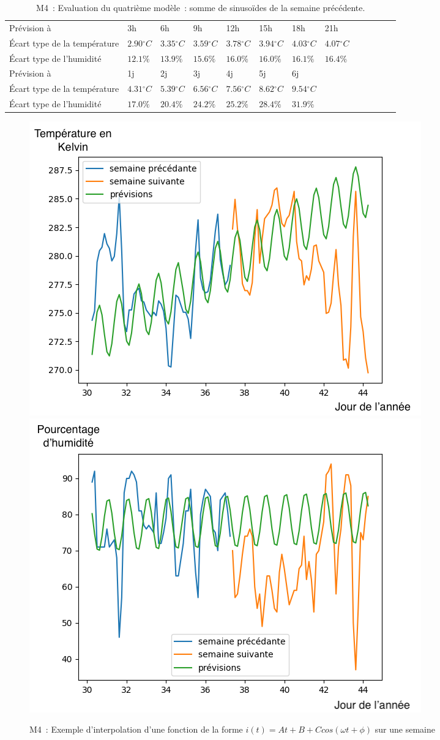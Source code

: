 \documentclass[11pt,a4paper]{article}
\begin{document}
\begin{table}[h]
\begin{center}
\begin{tabular}{lllllllllllll}\hline
\hline
Prévision à                  &3h                         &6h                        &9h                           &12h                         &15h                          &18h          &         21h      \\
Écart type de la température& $2.90{}^{\circ}C$& $3.35{}^{\circ}C$& $3.59{}^{\circ}C$& $3.78{}^{\circ}C$& $3.94{}^{\circ}C$& $4.03{}^{\circ}C$&$4.07{}^{\circ}C$\\
Écart type de l'humidité &$12.1\%$ & $13.9\%$ & $15.6\%$ & $16.0\%$ & $16.0\%$ & $16.1\%$ & $16.4\%$  \\
\hline
Prévision à                  & 1j &           2j            &3j            &4j          &5j            & 6j & \\
Écart type de la température&$4.31{}^{\circ}C$&$5.39{}^{\circ}C$&$6.56{}^{\circ}C$&$7.56{}^{\circ}C$&$8.62{}^{\circ}C$&$9.54{}^{\circ}C$ \\
Écart type de l'humidité      & $17.0\%$ &  $ 20.4\% $         &  $ 24.2\% $         &  $ 25.2\% $        &  $ 28.4\% $         &  $ 31.9\% $  \\
\hline 
\end{tabular}
\caption{M4~: Evaluation du quatrième modèle~: somme de sinusoïdes de la semaine précédente.}\label{tab:sinusoidesSP}
\end{center}
\end{table}
	
\begin{figure} [H]
\centering
\includegraphics[width=0.48 \textwidth]{./imagesTIPE/cosDS.png}\quad
\includegraphics[width=0.48 \textwidth]{./imagesTIPE/cosDSH.png}
\caption{\label{fig:cosDS} M4~: Exemple d'interpolation d'une fonction de la forme $i(t) = At +B + C cos (\omega t + \phi)$ sur une semaine}
\end{figure}
\end{document}
